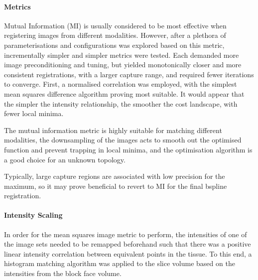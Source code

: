       \paragraph{Metrics}
        Mutual Information (MI) is usually considered to be most effective when registering images from different modalities. However, after a plethora of parameterisations and configurations was explored based on this metric, incrementally simpler and simpler metrics were tested. Each demanded more image preconditioning and tuning, but yielded monotonically closer and more consistent registrations, with a larger capture range, and required fewer iterations to converge. First, a normalised correlation was employed, with the simplest mean squares difference algorithm proving most suitable. It would appear that the simpler the intensity relationship, the smoother the cost landscape, with fewer local minima.
        
        The mutual information metric is highly suitable for matching different modalities, the downsampling of the images acts to smooth out the optimised function and prevent trapping in local minima, and the optimisation algorithm is a good choice for an unknown topology. 
        

        Typically, large capture regions are associated with low precision for the maximum, so it may prove beneficial to revert to MI for the final bspline registration.

      \paragraph{Intensity Scaling}
        In order for the mean squares image metric to perform, the intensities of one of the image sets needed to be remapped beforehand such that there was a positive linear intensity correlation between equivalent points in the tissue. To this end, a histogram matching algorithm was applied to the slice volume based on the intensities from the block face volume.


